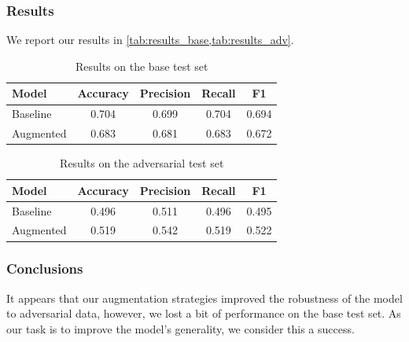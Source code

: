 \documentclass[english, xcolor={table,usenames}]{beamer}
\begin{document}
\begin{frame}
  \frametitle{Results}

  We report our results in \cref{tab:results_base,tab:results_adv}.

  \begin{table}[h]
    \centering
    \caption{Results on the base test set} \label{tab:results_base}
    \begin{tabularx}{0.90\linewidth}{|X|c|c|c|c|}
      \hline
      \textbf{Model} & \textbf{Accuracy} & \textbf{Precision} & \textbf{Recall} & \textbf{F1} \\
      \hline
      \hline
      Baseline       & 0.704             & 0.699              & 0.704           & 0.694       \\
      Augmented      & 0.683             & 0.681              & 0.683           & 0.672       \\
      \hline
    \end{tabularx}
  \end{table}

  \begin{table}[h]
    \centering
    \caption{Results on the adversarial test set} \label{tab:results_adv}
    \begin{tabularx}{0.90\linewidth}{|X|c|c|c|c|}
      \hline
      \textbf{Model} & \textbf{Accuracy} & \textbf{Precision} & \textbf{Recall} & \textbf{F1} \\
      \hline
      \hline
      Baseline       & 0.496             & 0.511              & 0.496           & 0.495       \\
      Augmented      & 0.519             & 0.542              & 0.519           & 0.522       \\
      \hline
    \end{tabularx}
  \end{table}
\end{frame}


\begin{frame}
  \frametitle{Conclusions}

  It appears that our augmentation strategies \alert{improved} the robustness of the model
  to adversarial data, however, we lost a bit of performance on the base test set. As our
  task is to improve the model's generality, we consider this a \alert{success}.

\end{frame}
\end{document}
